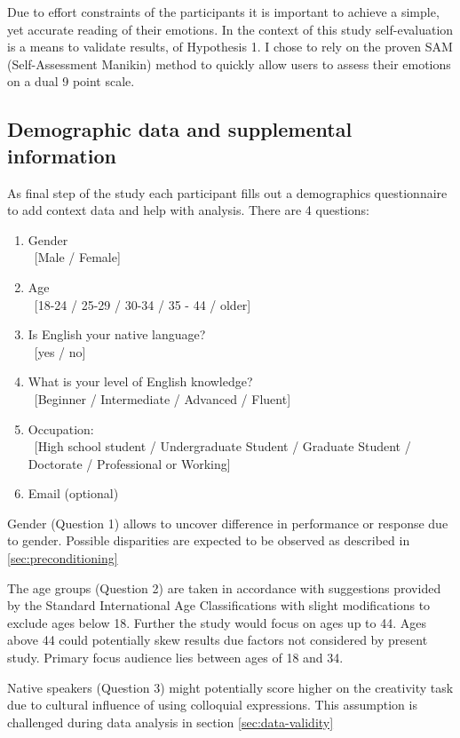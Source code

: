 	Due to effort constraints of the participants it is important to achieve a simple, yet accurate reading of their emotions. In the context of this study self-evaluation is a means to validate results, of Hypothesis 1. I chose to rely on the proven SAM (Self-Assessment Manikin) method \cite{Bradley1994} to quickly allow users to assess their emotions on a dual 9 point scale.
	
	\subsection{Demographic data and supplemental information} \label{sec:demographics}
	
	As final step of the study each participant fills out a demographics questionnaire to add context data and help with analysis. There are 4 questions:
	
	\begin{enumerate}
		\item Gender \\ \ [Male / Female]
		\item Age \\ \ [18-24 / 25-29 / 30-34 / 35 - 44 / older]
		\item Is English your native language? \\ \ [yes / no]
		\item What is your level of English knowledge? \\ \
			[Beginner  / Intermediate / Advanced / Fluent]
		\item Occupation: \\ \ [High school student / Undergraduate Student / Graduate Student / Doctorate / Professional or Working]
		\item Email (optional)
	\end{enumerate}

	Gender (Question 1) allows to uncover difference in performance or response due to gender. Possible disparities are expected to be observed as described in \ref{sec:preconditioning}

	The age groups (Question 2) are taken in accordance with suggestions provided by the Standard International Age Classifications \cite{UN1982} with slight modifications to exclude ages below 18. Further the study would focus on ages up to 44. Ages above 44 could potentially skew results due factors not considered by present study. Primary focus audience lies between ages of 18 and 34.
	
	Native speakers (Question 3) might potentially score higher on the creativity task due to cultural influence of using colloquial expressions. This assumption is challenged during data analysis in section \ref{sec:data-validity}
	
